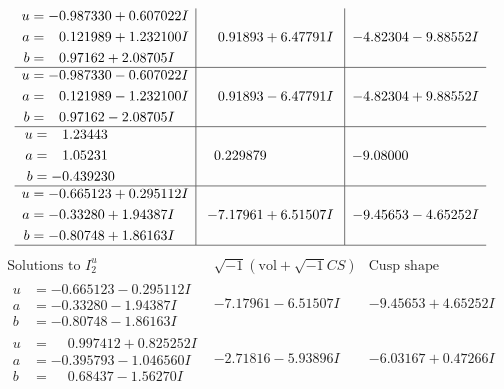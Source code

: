\documentclass[1p]{elsarticle_modified}
\theoremstyle{definition}
\newcommand{\I}{\sqrt{-1}}
\begin{document}
$$\begin{array}{c|c|c}
\begin{aligned}
u &= -0.987330 + 0.607022 I \\
a &= \phantom{-}0.121989 + 1.232100 I \\
b &= \phantom{-}0.97162 + 2.08705 I\end{aligned}
 & \phantom{-}0.91893 + 6.47791 I & -4.82304 - 9.88552 I \\ \hline\begin{aligned}
u &= -0.987330 - 0.607022 I \\
a &= \phantom{-}0.121989 - 1.232100 I \\
b &= \phantom{-}0.97162 - 2.08705 I\end{aligned}
 & \phantom{-}0.91893 - 6.47791 I & -4.82304 + 9.88552 I \\ \hline\begin{aligned}
u &= \phantom{-}1.23443\phantom{ +0.000000I} \\
a &= \phantom{-}1.05231\phantom{ +0.000000I} \\
b &= -0.439230\phantom{ +0.000000I}\end{aligned}
 & \phantom{-}0.229879\phantom{ +0.000000I} & -9.08000\phantom{ +0.000000I} \\ \hline\begin{aligned}
u &= -0.665123 + 0.295112 I \\
a &= -0.33280 + 1.94387 I \\
b &= -0.80748 + 1.86163 I\end{aligned}
 & -7.17961 + 6.51507 I & -9.45653 - 4.65252 I\\
 \hline 
 \end{array}$$\newpage$$\begin{array}{c|c|c}  
\text{Solutions to }I^u_{2}& \I (\text{vol} + \sqrt{-1}CS) & \text{Cusp shape}\\
 \hline 
\begin{aligned}
u &= -0.665123 - 0.295112 I \\
a &= -0.33280 - 1.94387 I \\
b &= -0.80748 - 1.86163 I\end{aligned}
 & -7.17961 - 6.51507 I & -9.45653 + 4.65252 I \\ \hline\begin{aligned}
u &= \phantom{-}0.997412 + 0.825252 I \\
a &= -0.395793 - 1.046560 I \\
b &= \phantom{-}0.68437 - 1.56270 I\end{aligned}
 & -2.71816 - 5.93896 I & -6.03167 + 0.47266 I \\ \hline\begin{aligned}

\end{aligned}
\end{array}$$
\end{document}
